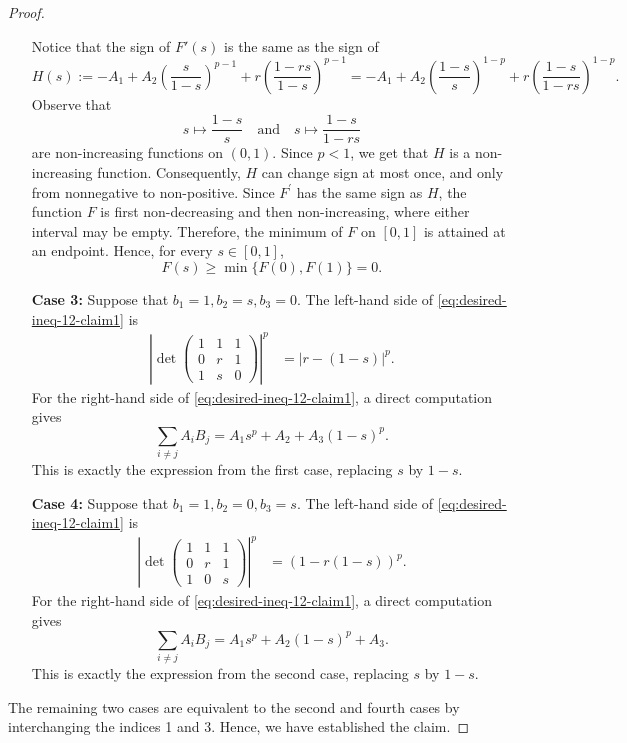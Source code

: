\documentclass[11pt,a4paper]{amsart}
\theoremstyle{plain}
\theoremstyle{definition}
\begin{document}
\begin{proof}
\begin{enumerate}[wide =0pt, labelwidth= 1.1cm]
        Notice that the sign of $F'(s)$ is the same as the sign of 
        $$
            H(s) := -A_1 +A_2\left(\frac{s}{1-s}\right)^{p-1}+ r \left(\frac{1-rs}{1-s}\right)^{p-1} = -A_1 +A_2\left(\frac{1-s}{s}\right)^{1-p}+ r \left(\frac{1-s}{1-rs}\right)^{1-p}. 
        $$ 
        Observe that
        \[
            s \longmapsto \frac{1-s}{s} \quad \text{and} \quad s \longmapsto \frac{1-s}{1-r s}
        \]
        are non-increasing functions on $(0,1)$. Since $p <1$, we get that $H$ is a non-increasing function. Consequently, $H$ can change sign at most once, and only from nonnegative to non-positive. Since $F^{\prime}$ has the same sign as $H$, the function $F$ is first non-decreasing and then non-increasing, where either interval may be empty. Therefore, the minimum of $F$ on $[0,1]$ is attained at an endpoint. Hence, for every $s \in[0,1]$,
$$
F(s) \geq \min \{F(0), F(1)\}=0.
$$
        \item[\bf Case 3:]
        Suppose that $b_1 = 1, b_2 =s ,b_3 = 0$. The left-hand side of \eqref{eq:desired-ineq-12-claim1} is 
        \begin{align}
            \left|\operatorname{det}\left(\begin{array}{ccc}1 & 1 & 1 \\ 0 & r & 1 \\ 1 & s & 0\end{array}\right)\right|^p   
            &= |r-(1-s)|^p.
        \end{align}
        For the right-hand side of \eqref{eq:desired-ineq-12-claim1}, a direct computation gives 
        \[
             \sum_{i \neq j} A_i B_j = A_1 s^p + A_2 + A_3(1-s)^p .
        \]
        This is exactly the expression from the first case, replacing $s$ by $1-s$.
        \item[\bf Case 4:] 
        Suppose that $b_1 = 1, b_2 =0 ,b_3 = s$. The left-hand side of \eqref{eq:desired-ineq-12-claim1} is 
        \begin{align}
            \left|\operatorname{det}\left(\begin{array}{ccc}1 & 1 & 1 \\ 0 & r & 1 \\ 1 & 0 & s\end{array}\right)\right|^p   
            &= (1-r(1-s))^p.
        \end{align}
        For the right-hand side of \eqref{eq:desired-ineq-12-claim1}, a direct computation gives 
        \[
             \sum_{i \neq j} A_i B_j = A_1 s^p + A_2(1-s)^p +A_3.
        \]
        This is exactly the expression from the second case, replacing $s$ by $1-s$.
    \end{enumerate}
    The remaining two cases are equivalent to the second and fourth cases by interchanging the indices 1 and 3. Hence, we have established the claim.


\end{proof}
\end{document}
